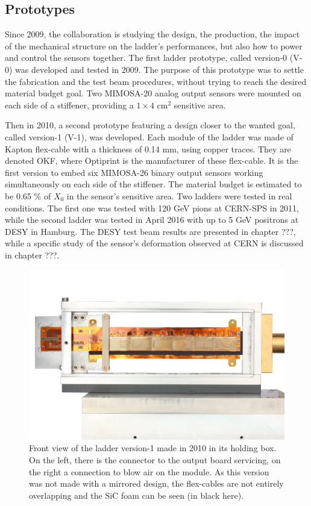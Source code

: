     \subsection{Prototypes}

    Since 2009, the collaboration is studying the design, the production, the impact of the mechanical structure on the ladder's performances, but also how to power and control the sensors together.
    The first ladder prototype, called version-0 (V-0) was developed and tested in 2009.
    The purpose of this prototype was to settle the fabrication and the test beam procedures, without trying to reach the desired material budget goal.
    Two MIMOSA-20 analog output sensors were mounted on each side of a stiffener, providing a $1 \times 4 \text{ cm}^2$ sensitive area.

    Then in 2010, a second prototype featuring a design closer to the wanted goal, called version-1 (V-1), was developed.
    Each module of the ladder was made of Kapton flex-cable with a thickness of 0.14 mm, using copper traces.
    They are denoted \gls{OKF}, where Optiprint is the manufacturer of these flex-cable.
    It is the first version to embed six MIMOSA-26 binary output sensors working simultaneously on each side of the stiffener.
    The material budget is estimated to be 0.65 \% of $X_0$ in the sensor's sensitive area. 
    Two ladders were tested in real conditions.
    The first one was tested with 120 GeV pions at CERN-SPS in 2011, while the second ladder was tested in April 2016 with up to 5 GeV positrons at DESY in Hamburg. 
    The DESY test beam results are presented in chapter ???, while a specific study of the sensor's deformation observed at CERN is discussed in chapter ???.

    \begin{figure}[!h]
      \includegraphics[width = 12 cm]{Pictures/vxd/plume_ladder2010_frontView}
      \caption{Front view of the ladder version-1 made in 2010 in its holding box. On the left, there is the connector to the output board servicing, on the right a connection to blow air on the module. As this version was not made with a mirrored design, the flex-cables are not entirely overlapping and the SiC foam can be seen (in black here).}
    \end{figure}

